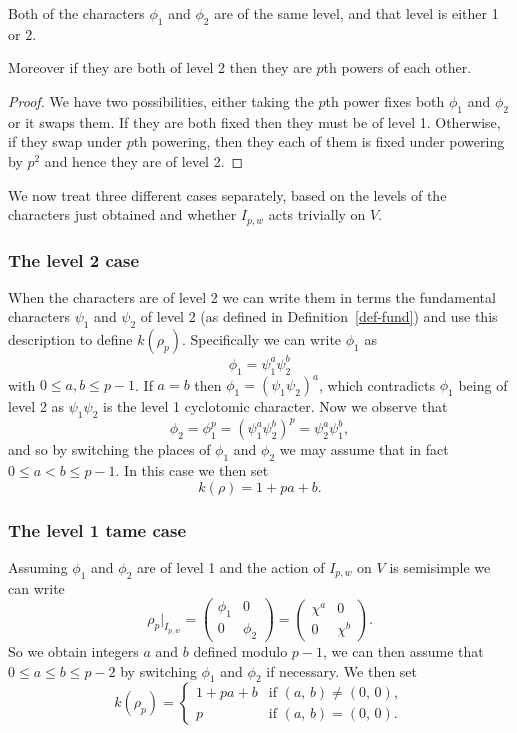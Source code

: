 \documentclass[a4paper,12pt]{article}
\begin{document}
\begin{prop}
Both of the characters $\phi_1$ and $\phi_2$ are of the same level, and that level is either 1 or 2.

Moreover if they are both of level 2 then they are $p$th powers of each other.
\end{prop}
\begin{proof}
We have two possibilities, either taking the $p$th power fixes both $\phi_1$ and $\phi_2$ or it swaps them.
If they are both fixed then they must be of level 1.
Otherwise, if they swap under $p$th powering, then they each of them is fixed under powering by $p^2$ and hence they are of level 2.
\end{proof}

We now treat three different cases separately, based on the levels of the characters just obtained and whether $I_{p,w}$ acts trivially on $V$.

\subsubsection{The level 2 case}
When the characters are of level 2 we can write them in terms the fundamental characters $\psi_1$ and $\psi_2$ of level 2 (as defined in Definition~\ref{def-fund}) and use this description to define $k(\rho_p)$.
Specifically we can write $\phi_1$ as
\[
\phi_1 = \psi_1^a\psi_2^b
\]
with $0\le a,b\le p-1$.
If $a = b$ then $\phi_1 = (\psi_1 \psi_2)^a$, which contradicts $\phi_1$ being of level 2 as $\psi_1\psi_2$ is the level 1 cyclotomic character.
Now we observe that
\[
\phi_2 = \phi_1^p = (\psi_1^a\psi_2^b)^p = \psi_2^a\psi_1^b,
\]
and so by switching the places of $\phi_1$ and $\phi_2$ we may assume that in fact $0\le a < b\le p-1$.
In this case we then set
\[
k(\rho) = 1 + pa + b.
\]



\subsubsection{The level 1 tame case}
Assuming $\phi_1$ and $\phi_2$ are of level 1 and the action of $I_{p,w}$ on $V$ is semisimple we can write
\[
\rho_p |_{I_{p,w}} = \begin{pmatrix}
\phi_1 & 0 \\
0      & \phi_2 \end{pmatrix} = \begin{pmatrix}
\chi^a & 0 \\
0      & \chi^b \end{pmatrix}.
\]
So we obtain integers $a$ and $b$ defined modulo $p-1$, we can then assume that $0\le a \le b \le p-2$ by switching $\phi_1$ and $\phi_2$ if necessary.
We then set
\[
k(\rho_p) = \begin{cases}
1 + pa + b & \text{if }(a,\,b) \ne (0,\,0), \\
         p & \text{if }(a,\,b) = (0,\,0).
\end{cases}
\]
\end{document}
